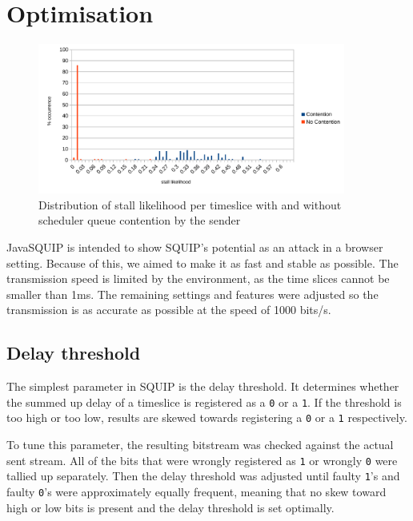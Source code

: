 \documentclass[11pt,
  titlepage=false,
]{scrreprt}
\begin{document}
\chapter{Optimisation}
\label{ch:optimisation}
\begin{figure}
\centering
\includegraphics[width=0.9\textwidth]{figures/contentionhistogram}

\caption{Distribution of stall likelihood per timeslice with and without scheduler queue contention by the sender}
\label{fig:contentionhistogram}
\end{figure}

JavaSQUIP is intended to show SQUIP's potential as an attack in a browser setting.
Because of this, we aimed to make it as fast and stable as possible.
The transmission speed is limited by the environment, as the time slices cannot be smaller than 1ms.
The remaining settings and features were adjusted so the transmission is as accurate as possible at the speed of 1000 bits/s.

\section{Delay threshold}
\label{sec:delaythreshold}

The simplest parameter in SQUIP is the delay threshold.
It determines whether the summed up delay of a timeslice is registered as a \texttt{0} or a \texttt{1}.
If the threshold is too high or too low, results are skewed towards registering a \texttt{0} or a \texttt{1} respectively.

To tune this parameter, the resulting bitstream was checked against the actual sent stream.
All of the bits that were wrongly registered as \texttt{1} or wrongly \texttt{0} were tallied up separately.
Then the delay threshold was adjusted until faulty \texttt{1}'s and faulty \texttt{0}'s were approximately equally frequent,
meaning that no skew toward high or low bits is present and the delay threshold is set optimally.
\end{document}

